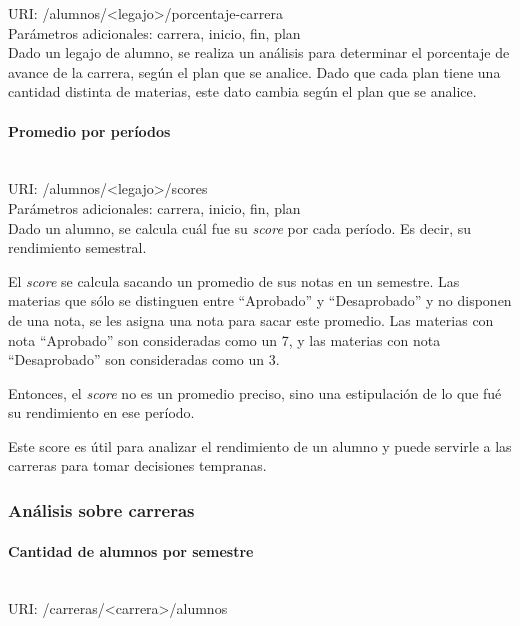 URI: /alumnos/<legajo>/porcentaje-carrera \\

Parámetros adicionales: carrera, inicio, fin, plan \\

Dado un legajo de alumno, se realiza un análisis para determinar el porcentaje de avance de la carrera, según el plan que se analice. Dado que cada plan tiene una cantidad distinta de materias, este dato cambia según el plan que se analice.

\paragraph{Promedio por períodos}\mbox{}\\

URI: /alumnos/<legajo>/scores \\

Parámetros adicionales: carrera, inicio, fin, plan \\

Dado un alumno, se calcula cuál fue su \textit{score} por cada período. Es decir, su rendimiento semestral. 

El \textit{score} se calcula sacando un promedio de sus notas en un semestre. Las materias que sólo se distinguen entre “Aprobado” y “Desaprobado” y no disponen de una nota, se les asigna una nota para sacar este promedio.
Las materias con nota “Aprobado” son consideradas como un 7, y las materias con nota “Desaprobado” son consideradas como un 3.

Entonces, el \textit{score} no es un promedio preciso, sino una estipulación de lo que fué su rendimiento en ese período.

Este score es útil para analizar el rendimiento de un alumno y puede servirle a las carreras para tomar decisiones tempranas.

\subsubsection{Análisis sobre carreras}

\paragraph{Cantidad de alumnos por semestre}\mbox{}\\

URI: /carreras/<carrera>/alumnos \\

